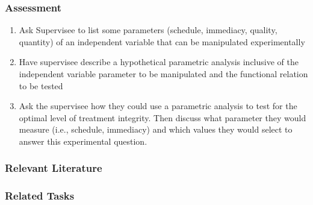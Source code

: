 \subsection{Assessment}
\begin{enumerate}
\item Ask Supervisee to list some parameters (schedule, immediacy, quality, quantity) of an independent variable that can be manipulated experimentally
\item Have supervisee describe a hypothetical parametric analysis inclusive of the independent variable parameter to be manipulated and the functional relation to be tested 
\item Ask the supervisee how they could use a parametric analysis to test for the optimal level of treatment integrity. Then discuss what parameter they would measure (i.e., schedule, immediacy) and which values they would select to answer this experimental question.  
\end{enumerate}
%
\subsection{Relevant Literature}
\begin{refsection}
\nocite{cooper2007applied,lerman1996methodology,lerman2002reinforcement}
\printbibliography[heading=none]
\end{refsection}
%
\subsection{Related Tasks} 
\fourbThree{}\\
\fourFKThirtyThree{}\\
%
%
%
%
%
%
%
%
\chapter{\foursecc{}}
\section[\fourcOne{}]{\fourcOne{}%
              }
